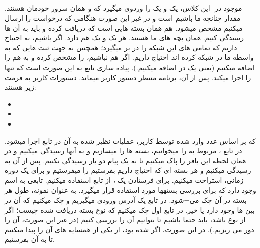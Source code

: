 \documentclass{article}
\begin{document}
	\subsection{}
   موجود در ‌ این کلاس، یک  و یک  را وردوی میگیرد که  و  همان سرور خودمان هستند. مقدار  چنانچه ما  باشیم  است و در غیر این صورت هنگامی که درخواست  را ارسال میکنیم مشخص میشود.  هم همان بسته هایی است که دریافت کرده و باید به آن ها رسیدگی کنیم.  همان بچه های ما هستند. هر  یک  و یک  هم دارد. اگر  باشیم، به  احتیاج داریم که تمامی  های این شبکه را در بر میگیرد؛ همچنین به  جهت ثبت  هایی که به واسطه ما در شبکه  کرده اند احتیاج داریم. اگر هم ‌نباشیم،  را مشخص کرده و به  هم  را اضافه میکنیم (یعنی یک  در  اضافه میکنیم.).
پیاده سازی تابع  به این صورت است که تنها  را اجرا میکند. پس از آن، برنامه منتظر دستور کاربر میماند. دستورات کاربر به فرمت زیر هستند:
    \begin{itemize}
\item	{}
\item	{}
\item	 {}
    \end{itemize}
که بر اساس عدد وارد شده توسط کاربر، عملیات نظیر شده به آن در تابع  اجرا میشود.
در تابع ،  مربوط به  را میخوانیم، بسته ها را میسازیم و به آنها رسیدگی میکنیم و در همان لحظه این بافر را پاک میکنیم تا به یک پیام دو بار رسیدگی نکنیم. پس از آن به  رسیدگی میکنیم و هر بسته ای که احتیاج داریم بفرستیم را میفرستیم و برای یک دوره زمانی، استراحت  میکنیم. 
برای فرستادن یک ، از تابع  استفاده میکنیم.
تابعی به اسم  وجود دارد که برای بررسی بستهها مورد استفاده قرار میگیرد. به عنوان نمونه، طول هر بسته در آن چک می¬شود.
در تابع  یک آدرس ورودی میگیریم و چک میکنیم که آن  در بین  ها وجود دارد یا خیر.
در تابع  اول چک میکنیم که نوع بسته دریافت شده چیست؛ اگر از نوع  باشد، باید حتما  باشیم تا بتوانیم آن را بررسی کنیم (در غیر این صورت، آن را دور می ریزیم.). در این صورت، اگر  شده بود، از یکی از همسایه های آن را پیدا میکنیم تا به آن  بفرستیم.  
\end{document}
